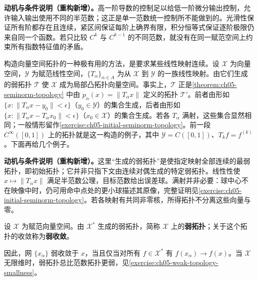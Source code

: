 \documentclass[../../main.tex]{subfiles}
\begin{document}
\begin{remark}
\textbf{动机与条件说明（重构新增）。}高一阶导数的控制足以给低一阶微分输出控制，允许输入输出使用不同的半范数；这正是单一范数统一控制所不能做到的。光滑性保证所有阶都存在且连续，紧区间保证每阶上确界有限，积分恒等式保证逐阶极限仍来自同一个函数。若只比较 $C^k$ 与 $C^{k-1}$ 的不同范数，就没有在同一赋范空间上约束所有指数特征值的矛盾。
\end{remark}
构造向量空间拓扑的一种极有用的方法，是要求某些线性映射连续。设 $\mathcal X$ 为向量空间，$\mathcal Y$ 为赋范线性空间，$\{T_\alpha\}_{\alpha\in A}$ 为从 $\mathcal X$ 到 $\mathcal Y$ 的一族线性映射。由它们生成的弱拓扑 $\mathcal T$ 使 $\mathcal X$ 成为局部凸拓扑向量空间。事实上，$\mathcal T$ 正是\cref{theorem:ch05-seminorm-topology} 中由 $p_\alpha(x)=\|T_\alpha x\|$ 定义的拓扑 $\mathcal T'$。前者由形如 $\{x:\|T_\alpha x-y_0\|<\epsilon\}$（$y_0\in\mathcal Y$）的集合生成，后者由形如 $\{x:\|T_\alpha x-T_\alpha x_0\|<\epsilon\}$（$x_0\in\mathcal X$）的集合生成。若各 $T_\alpha$ 满射，这些集合显然相同；一般情形留作\cref{exercise:ch05-initial-seminorm-topology}。前一段 $C^\infty([0,1])$ 上的拓扑就是这一构造的例子，其中 $\mathcal Y=C([0,1])$、$T_kf=f^{(k)}$。下面再给几个例子。
\begin{remark}
\textbf{动机与条件说明（重构新增）。}这里“生成的弱拓扑”是使指定映射全部连续的最弱拓扑，即初始拓扑；它并非只指下文由连续对偶生成的特定弱拓扑。线性性使 $x\mapsto\|T_\alpha x\|$ 满足半范数公理，目标范数给出误差球。满射并非必要：球中心不在映像中时，仍可用命中点处的更小球描述其原像，完整证明见\cref{exercise:ch05-initial-seminorm-topology}。若各映射有共同非零核，所得拓扑不分离这些向量与零。
\end{remark}
\begin{definition}[弱拓扑与弱收敛]\label{definition:ch05-weak-topology}
设 $\mathcal X$ 为赋范向量空间。由 $\mathcal X^*$ 生成的弱拓扑，简称 $\mathcal X$ 上的\textbf{弱拓扑}；关于这个拓扑的收敛称为\textbf{弱收敛}。
\end{definition}
因此，网 $\{x_\alpha\}$ 弱收敛于 $x$，当且仅当对所有 $f\in\mathcal X^*$ 有 $f(x_\alpha)\to f(x)$。当 $\mathcal X$ 无限维时，弱拓扑总比范数拓扑更弱，见\cref{exercise:ch05-weak-topology-smallness}。
\end{document}
